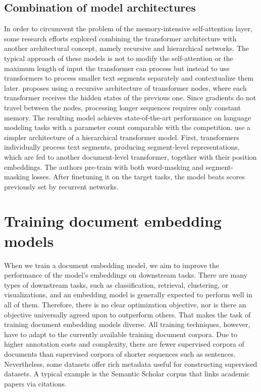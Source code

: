 \subsection{Combination of model architectures}

In order to circumvent the problem of the memory-intensive self-attention
layer, some research efforts explored combining the transformer architecture
with another architectural concept, namely recursive and hierarchical networks.
The typical approach of these models is not to modify the self-attention or the
maximum length of input the transformer can process but instead to use
transformers to process smaller text segments separately and contextualize them
later. \cite{dai2019transformer} proposes using a recursive architecture of
transformer nodes, where each transformer receives the hidden states of the
previous one. Since gradients do not travel between the nodes, processing
longer sequences requires only constant memory. The resulting model achieves
state-of-the-art performance on language modeling tasks with a parameter count
comparable with the competition. \cite{yang2020beyond} use a simpler
architecture of a hierarchical transformer model. First, transformers
individually process text segments, producing segment-level representations,
which are fed to another document-level transformer, together with their
position embeddings. The authors pre-train with both word-masking and
segment-masking losses. After finetuning it on the target tasks, the model
beats scores previously set by recurrent networks.

\section{Training document embedding models}

When we train a document embedding model, we aim to improve the performance of
the model's embeddings on downstream tasks. There are many types of downstream
tasks, such as classification, retrieval, clustering, or visualizations, and an
embedding model is generally expected to perform well in all of them.
Therefore, there is no clear optimization objective, nor is there an objective
universally agreed upon to outperform others. That makes the task of training
document embedding models diverse. All training techniques, however, have to
adapt to the currently available training document corpora. Due to higher
annotation costs and complexity, there are fewer supervised corpora of
documents than supervised corpora of shorter sequences such as sentences.
Nevertheless, some datasets offer rich metadata useful for constructing
supervised datasets. A typical example is the Semantic Scholar
corpus \citep{ammar2018construction} that links academic papers via citations.

